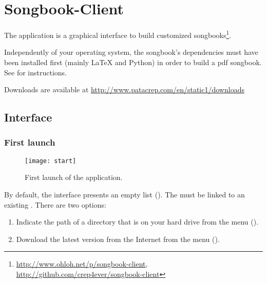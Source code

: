 \chapter{Songbook-Client}
\setcounter{chapter}{2}
\label{chap:songbook-client}
\minitoc

The \client application is a graphical interface to build customized
songbooks\footnote{\url{http://www.ohloh.net/p/songbook-client},
  \url{http://github.com/crep4ever/songbook-client}}.

\begin{nota}
Independently of your operating system, the songbook's dependencies must
have been installed first (mainly \LaTeX{} and Python) in order to
build a pdf songbook. See  for instructions.
\end{nota}

Downloads are available at \url{http://www.patacrep.com/en/static1/downloads}


\section{Interface}

\subsection{First launch}

\begin{figure}
  \centering
  \texttt{[image: start]}
  \caption{First launch of the application.}
  \label{fig:start}
\end{figure}

By default, the interface presents an empty list
(). The \client must be linked to an existing
\songbook. There are two options:

\begin{enumerate}
\item Indicate the path of a  directory that is on
  your hard drive from the menu 
  ().
\item Download the latest version from the Internet from the menu
   ().
\end{enumerate}

